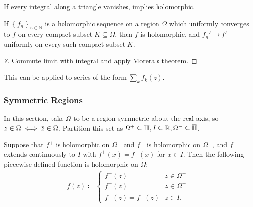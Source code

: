 \begin{slogan}

If every integral along a triangle vanishes, implies holomorphic.

\end{slogan}

\begin{corollary}

If \(\left\{{ f_n }\right\}_{n\in {\mathbb{N}}}\) is a holomorphic
sequence on a region \(\Omega\) which uniformly converges to \(f\) on
every compact subset \(K \subseteq \Omega\), then \(f\) is holomorphic,
and \(f_n' \to f'\) uniformly on every such compact subset \(K\).

\end{corollary}

\begin{proof}[?]

Commute limit with integral and apply Morera's theorem.

\end{proof}

\begin{remark}

This can be applied to series of the form \(\sum_k f_k(z)\).

\end{remark}

\hypertarget{symmetric-regions}{%
\subsubsection{Symmetric Regions}\label{symmetric-regions}}

In this section, take \(\Omega\) to be a region symmetric about the real
axis, so
\(z\in \Omega \iff \mkern 1.5mu\overline{\mkern-1.5muz\mkern-1.5mu}\mkern 1.5mu \in \Omega\).
Partition this set as
\(\Omega^+ \subseteq {\mathbb{H}}, I \subseteq {\mathbb{R}}, \Omega^- \subseteq \mkern 1.5mu\overline{\mkern-1.5mu{\mathbb{H}}\mkern-1.5mu}\mkern 1.5mu\).

\begin{theorem}

Suppose that \(f^+\) is holomorphic on \(\Omega^+\) and \(f^-\) is
holomorphic on \(\Omega^-\), and \(f\) extends continuously to \(I\)
with \(f^+(x) = f^-(x)\) for \(x\in I\). Then the following
piecewise-defined function is holomorphic on \(\Omega\):
\begin{align*}
f(z) 
\coloneqq
\begin{cases}
f^+(z) & z\in \Omega^+ 
\\
f^-(z) & z\in \Omega^-
\\
f^+(z) = f^-(z) & z\in I.
\end{cases}
\end{align*}

\end{theorem}

